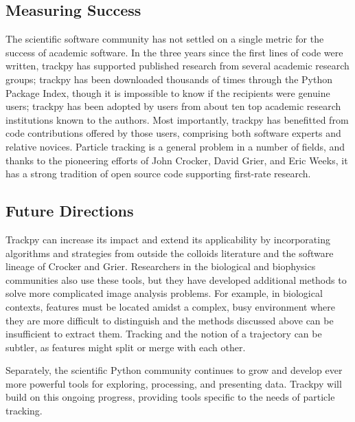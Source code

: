 \subsection{Measuring Success}
The scientific software community has not settled on a single metric for the success of academic software. In the three years since the first lines of code were written, trackpy has supported published research from several academic research groups; trackpy has been downloaded thousands of times through the Python Package Index, though it is impossible to know if the recipients were genuine users; trackpy has been adopted by users from about ten top academic research institutions known to the authors. Most importantly, trackpy has benefitted from code contributions offered by those users, comprising both software experts and relative novices. Particle tracking is a general problem in a number of fields, and thanks to the pioneering efforts of John Crocker, David Grier, and Eric Weeks, it has a strong tradition of open source code supporting first-rate research.

\subsection{Future Directions}

Trackpy can increase its impact and extend its applicability by incorporating algorithms and strategies from outside the colloids literature and the software lineage of Crocker and Grier. Researchers in the biological and biophysics communities also use these tools, but they have developed additional methods to solve more complicated image analysis problems. For example, in biological contexts, features must be located amidst a complex, busy environment where they are more difficult to distinguish and the methods discussed above can be insufficient to extract them. Tracking and the notion of a trajectory can be subtler, as features might split or merge with each other.

Separately, the scientific Python community continues to grow and develop ever more powerful tools for exploring, processing, and presenting data. Trackpy will build on this ongoing progress, providing tools specific to the needs of particle tracking.